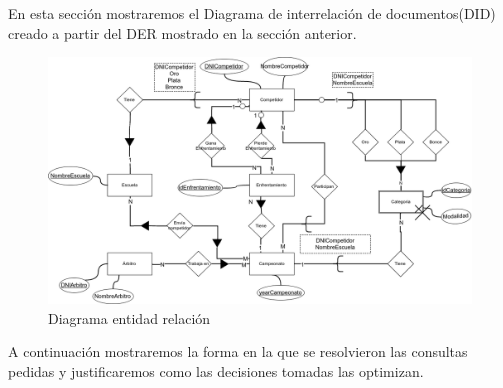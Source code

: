 En esta sección mostraremos el Diagrama de interrelación de documentos(DID) creado a partir del DER mostrado en la sección
anterior.

\begin{figure}[H]
  \centering
    \includegraphics[scale=0.4]{imagenes/DID.png}
  \caption{Diagrama entidad relación}
\end{figure}

A continuación mostraremos la forma en la que se resolvieron las consultas pedidas y justificaremos como las decisiones
tomadas las optimizan.

